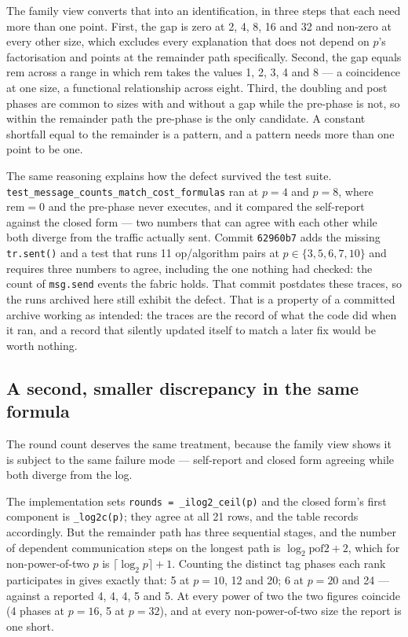 \documentclass[11pt]{article}
\begin{document}
The family view converts that into an identification, in three steps that each need more than
one point. First, the gap is zero at 2, 4, 8, 16 and 32 and non-zero at every other size, which
excludes every explanation that does not depend on $p$'s factorisation and points at the
remainder path specifically. Second, the gap equals $\mathrm{rem}$ across a range in which
$\mathrm{rem}$ takes the values 1, 2, 3, 4 and 8 --- a coincidence at one size, a functional
relationship across eight. Third, the doubling and post phases are common to sizes with and
without a gap while the pre-phase is not, so within the remainder path the pre-phase is the only
candidate. A constant shortfall equal to the remainder is a pattern, and a pattern needs more
than one point to be one.

The same reasoning explains how the defect survived the test suite.
\texttt{test\_message\_counts\_\allowbreak match\_cost\_formulas} ran at $p=4$ and $p=8$, where
$\mathrm{rem}=0$ and the pre-phase never executes, and it compared the self-report against the
closed form --- two numbers that can agree with each other while both diverge from the traffic
actually sent. Commit \texttt{62960b7} adds the missing \texttt{tr.sent()} and a test that runs
11 op/algorithm pairs at $p \in \{3,5,6,7,10\}$ and requires three numbers to agree, including
the one nothing had checked: the count of \texttt{msg.send} events the fabric holds. That commit
postdates these traces, so the runs archived here still exhibit the defect. That is a property of
a committed archive working as intended: the traces are the record of what the code did when it
ran, and a record that silently updated itself to match a later fix would be worth nothing.

\subsection{A second, smaller discrepancy in the same formula}

The round count deserves the same treatment, because the family view shows it is subject to the
same failure mode --- self-report and closed form agreeing while both diverge from the log.

The implementation sets \texttt{rounds = \_ilog2\_ceil(p)} and the closed form's first component
is \texttt{\_log2c(p)}; they agree at all 21 rows, and the table records
\modelok{} accordingly. But the remainder path has three sequential stages, and the number of
dependent communication steps on the longest path is $\log_2\mathrm{pof2} + 2$, which for
non-power-of-two $p$ is $\lceil\log_2 p\rceil + 1$. Counting the distinct tag phases each rank
participates in gives exactly that: 5 at $p=10$, 12 and 20; 6 at $p=20$ and 24 --- against a
reported 4, 4, 4, 5 and 5. At every power of two the two figures coincide (4 phases at $p=16$, 5
at $p=32$), and at every non-power-of-two size the report is one short.
\end{document}
